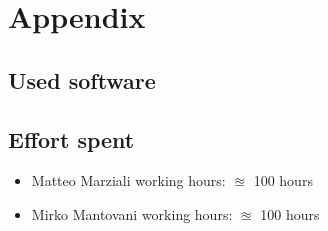 \documentclass{article}
\begin{document}
\clearpage
\section{Appendix}

\subsection{Used software}


\subsection{Effort spent}
\begin{itemize}

\item Matteo Marziali working hours:  $\approxeq$ 100 hours

\item Mirko Mantovani working hours:  $\approxeq$ 100 hours



\end{itemize}
\end{document}
